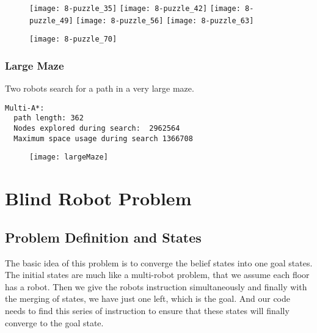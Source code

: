 \documentclass{article}
\begin{document}
\begin{figure}[!htb]

  \texttt{[image: 8-puzzle\_35]}
\endminipage\hfill
{}
  \texttt{[image: 8-puzzle\_42]}
\endminipage\hfill
{}
  \texttt{[image: 8-puzzle\_49]}
\endminipage
{}
  \texttt{[image: 8-puzzle\_56]}
\endminipage
{}
  \texttt{[image: 8-puzzle\_63]}
\endminipage
\end{figure}

\begin{figure}[!htb]

  \texttt{[image: 8-puzzle\_70]}
\endminipage\hfill
\end{figure}

\clearpage
\subsubsection{Large Maze}
Two robots search for a path in a very large maze.

\begin{lstlisting}
Multi-A*:  
  path length: 362
  Nodes explored during search:  2962564
  Maximum space usage during search 1366708
\end{lstlisting}
\begin{figure}[!htb]

  \texttt{[image: largeMaze]}
\endminipage\hfill
\end{figure}

\clearpage
\section{Blind Robot Problem}
\subsection{Problem Definition and States}
The basic idea of this problem is to converge the belief states into one goal states. The initial states are much like a multi-robot problem, that we assume each floor has a robot. Then we give the robots instruction simultaneously and finally with the merging of states, we have just one left, which is the goal. And our code needs to find this series of instruction to ensure that these states will finally converge to the goal state.
\end{document}
